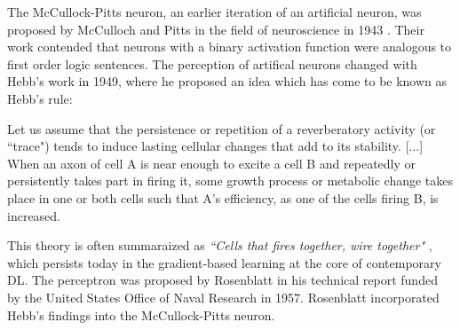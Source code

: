 The McCullock-Pitts neuron, an earlier iteration of an artificial neuron, was
proposed by McCulloch and Pitts in the field of neuroscience in 1943
\cite{McCulloch1943}. Their work contended that neurons with a binary activation
function were analogous to first order logic sentences. The perception of
artifical neurons changed with Hebb's work in 1949, where he proposed an idea
which has come to be known as Hebb's rule:

\begin{fancyquotes}
    Let us assume that the persistence or repetition of a reverberatory activity
    (or ``trace") tends to induce lasting cellular changes that add to its
    stability. [...] When an axon of cell A is near enough to excite a cell B
    and repeatedly or persistently takes part in firing it, some growth process
    or metabolic change takes place in one or both cells such that A’s
    efficiency, as one of the cells firing B, is increased. \cite{10.1007/978-3-642-70911-1_15}
\end{fancyquotes}

This theory is often summaraized as \textit{``Cells that fires together, wire
together"} \cite{doi:10.1126/science.7912852}, which persists today in the
gradient-based learning at the core of contemporary \gls{DL}. The perceptron was
proposed by Rosenblatt \cite{Rosenblatt_1957_6098} in his technical report
funded by the United States Office of Naval Research
\cite{doi:10.1177/030631296026003005} in 1957. Rosenblatt incorporated Hebb's
findings into the McCullock-Pitts neuron.

